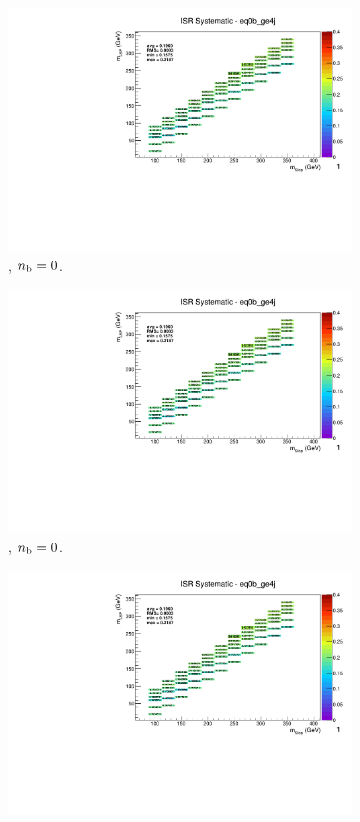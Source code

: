 \begin{figure}[ht!]
\begin{subfigure}[b]{0.32\textwidth}
    \includegraphics[width=\textwidth, page=14]{Figs/sms/t2cc/v37_3/systs/T2cc_ISR_eq0b_ge4j.pdf}
    \caption{\njhigh, $n_{\text{b}} = 0$.}
  \end{subfigure}
  \begin{subfigure}[b]{0.32\textwidth}
    \includegraphics[width=\textwidth, page=9]{Figs/sms/t2cc/v37_3/systs/T2cc_ISR_eq0b_ge4j.pdf}
    \caption{\njhigh, $n_{\text{b}} = 0$.}
  \end{subfigure}
  \begin{subfigure}[b]{0.32\textwidth}
    \includegraphics[width=\textwidth, page=1]{Figs/sms/t2cc/v37_3/systs/T2cc_ISR_eq0b_ge4j.pdf}

\end{subfigure}
\end{figure}

